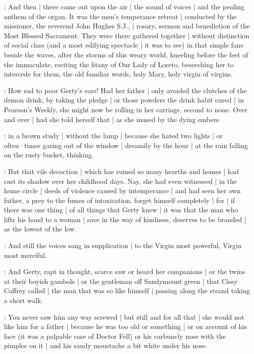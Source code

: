 \Nrelig:
And then |
there came out upon the air |
the sound of voices |
and the pealing anthem of the organ.
It was the men's temperance retreat |
conducted by the missioner,
the reverend John Hughes S.J., |
rosary, sermon and benediction
of the Most Blessed Sacrament.
They were there gathered together |
without distinction of social class
(and a most edifying spectacle |
it was to see)
in that simple fane beside the waves,
after the storms
of this weary world,
kneeling before the feet of the immaculate,
reciting the litany of Our Lady of Loreto,
beseeching her to intercede for them,
the old familiar words,
holy Mary,
holy virgin of virgins.

\gertyNovel:
How sad to poor Gerty's ears!%
Had her father |
only avoided the clutches of the demon drink,
by taking the pledge |
or those powders the drink habit cured |
in Pearson's Weekly,
she might now be rolling in her carriage,
second to none.
Over and over |
had she told herself that |
as she mused by the dying embers

\gertyReal:
in a brown study |
without the lamp |
because she hated two lights |
or often·times gazing out of the window |
dreamily by the hour |
at the rain falling on the rusty bucket,
thinking.

\gertyNovel:
But that vile decoction |
which has ruined so many hearths and homes |
had cast its shadow over her childhood days.
Nay,
she had even witnessed |
in the home circle |
deeds of violence
caused by intemperance |
and had seen her own father,
a prey to the fumes of intoxication,
forget himself completely |%
for |
if there was one thing |
of all things
that Gerty knew |
it was
that the man who lifts his hand to a woman |
save in the way of kindness,
deserves to be branded |
as the lowest of the low.

\Nrelig:
And still the voices sang in supplication |
to the Virgin most powerful,
Virgin most merciful.

\gertyNovel:
And Gerty,
rapt in thought,
scarce saw or heard her companions |
or the twins at their boyish gambols |
or the gentleman off Sandymount green |
that Cissy Caffrey called |
the man that was so like himself |
passing along the strand taking a short walk.

\gertyReal:
You never saw him any way screwed |
but still and for all that |
she would not like him for a father |
because he was too old or something |
or on account of his face
(it was a palpable case of Doctor Fell)%
or his carbuncly nose with the pimples on it |
and his sandy moustache a bit white under his nose.

